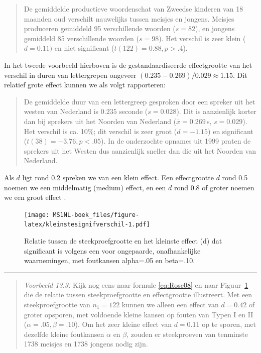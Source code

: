 \documentclass[
]{book}
\begin{document}
\begin{quote}
De gemiddelde productieve woordenschat van Zweedse kinderen van 18
maanden oud verschilt nauwelijks tussen meisjes en jongens. Meisjes
produceren gemiddeld 95 verschillende woorden (\(s=82\)), en jongens
gemiddeld 85 verschillende woorden (\(s=98\)). Het verschil is zeer
klein (\(d=0.11)\) en niet significant (\(t(122)=0.88, p>.4\)).
\end{quote}

In het tweede voorbeeld hierboven is de gestandaardiseerde effectgrootte
van het verschil in duren van lettergrepen ongeveer
\((0.235-0.269)/0.029 \approx 1.15\). Dit relatief grote effect kunnen we
als volgt rapporteren:

\begin{quote}
De gemiddelde duur van een lettergreep gesproken door een spreker uit
het westen van Nederland is \(0.235\) seconde (\(s=0.028\)). Dit is
aanzienlijk korter dan bij sprekers uit het Noorden van Nederland
(\(\overline{x}=0.269\) s, \(s=0.029\)). Het verschil is ca. 10\%; dit
verschil is zeer groot (\(d=-1.15\)) en significant
(\(t(38)=-3.76, p<.05\)). In de onderzochte opnames uit 1999 praten de
sprekers uit het Westen dus aanzienlijk sneller dan die uit het
Noorden van Nederland.
\end{quote}

Als \(d\) ligt rond 0.2 spreken we van een klein effect. Een effectgrootte
\(d\) rond 0.5 noemen we een middelmatig (medium) effect, en een \(d\) rond
0.8 of groter noemen we een groot effect \citep{Cohen88, Rose08}.

\begin{figure}
\centering
\texttt{[image: MS1NL-boek\_files/figure-latex/kleinstesignifverschil-1.pdf]}
\caption{\label{fig:kleinstesignifverschil}Relatie tussen de steekproefgrootte en het kleinste effect (d) dat significant is volgens een voor ongepaarde, onafhankelijke waarnemingen, met foutkansen alpha=.05 en beta=.10.}
\end{figure}

\begin{center}\rule{0.5\linewidth}{0.5pt}\end{center}

\begin{quote}
\emph{Voorbeeld 13.3:}
Kijk nog eens naar formule
\eqref{eq:Rose08}
en naar Figuur~\ref{fig:kleinstesignifverschil} die de relatie tussen
steekproefgrootte en effectgrootte illustreert. Met een
steekproefgrootte van \(n_1=122\) kunnen we alleen een effect van \(d=0.42\)
of groter opsporen, met voldoende kleine kansen op fouten van Typen I en
II (\(\alpha=.05, \beta=.10\)). Om het zeer kleine effect van \(d=0.11\) op
te sporen, met dezelfde kleine foutkansen \(\alpha\) en \(\beta\), zouden er
steekproeven van tenminste 1738 meisjes en 1738 jongens nodig zijn.
\end{quote}
\end{document}

